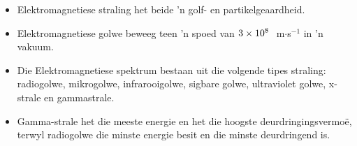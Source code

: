 \begin{itemize}[noitemsep] 
\item Elektromagnetiese straling het beide 'n golf- en partikelgeaardheid.
\item Elektromagnetiese golwe beweeg teen 'n spoed van $3\ensuremath{\times}{10}^{8}\phantom{\rule{3.33333pt}{0ex}}$ m$\cdot$s$^{-1}$ in 'n vakuum.
\item Die Elektromagnetiese spektrum bestaan uit die volgende tipes straling: radiogolwe, mikrogolwe, infrarooigolwe, sigbare golwe, ultraviolet golwe, x-strale en gammastrale. 
\item Gamma-strale het die meeste energie en het die hoogste deurdringingsvermo\"e, terwyl radiogolwe die minste energie besit en die minste deurdringend is. 
\end{itemize}

